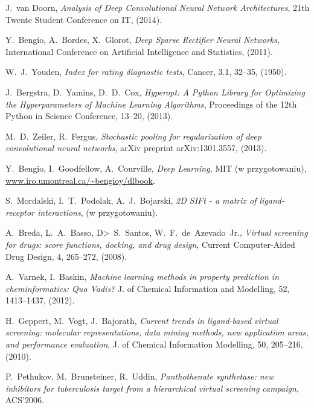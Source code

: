 \documentclass[a4paper,10pt]{report}
\begin{document}
  \begin{thebibliography}{99}
      J.~van Doorn,
      \emph{Analysis of Deep Convolutional Neural Network Architectures},
      21th Twente Student Conference on IT,
      (2014).
      
      Y.~Bengio, A.~Bordes, X.~Glorot,
      \emph{Deep Sparse Rectifier Neural Networks},
      International Conference on Artificial Intelligence and Statistics,
      (2011).
      
     W.~J.~Youden,
     \emph{Index for rating diagnostic tests},
     Cancer, 3.1, 32--35,
     (1950).
     
     J.~Bergstra, D.~Yamins, D.~D.~Cox,
     \emph{Hyperopt: A Python Library for Optimizing the Hyperparameters of Machine Learning Algorithms},
     Proceedings of the 12th Python in Science Conference, 13--20,
     (2013).
      
      M.~D.~Zeiler, R.~Fergus,
      \emph{Stochastic pooling for regularization of deep convolutional neural networks},
      arXiv preprint arXiv:1301.3557,
      (2013).
      
      Y.~Bengio, I.~Goodfellow, A.~Courville,
      \textit{Deep Learning},
      MIT (w przygotowaniu),
      \url{www.iro.umontreal.ca/~bengioy/dlbook}.

      S.~Mordalski, I.~T.~Podolak, A.~J.~Bojarski,
      \textit{2D SIFt - a matrix of ligand-receptor interactions},
      (w przygotowaniu).

      A.~Breda, L.~A.~Basso, D>~S.~Santos, W.~F.~de~Azevado~Jr., 
      \textit{Virtual screening for drugs: score functions, docking, and drug design},
      Current Computer-Aided Drug Design, 4, 265--272,
      (2008).

      A.~Varnek, I.~Baskin,
      \textit{Machine learning methods in property prediction in cheminformatics: Quo Vadis?}
      J. of Chemical Information and Modelling, 52, 1413--1437,
      (2012).

      H.~Geppert, M.~Vogt, J.~Bajorath,
      \textit{Current trends in ligand-based virtual screening: molecular representations, data mining methods, new application areas, and performance evaluation},
      J. of Chemical Information Modelling, 50, 205--216,
      (2010).

      P.~Pethukov, M.~Brunsteiner, R.~Uddin,
      \textit{Panthothenate synthetase: new inhibitors for tuberculosis target from a hierarchical virtual screening campaign},
      ACS'2006.


\end{thebibliography}
\end{document}
